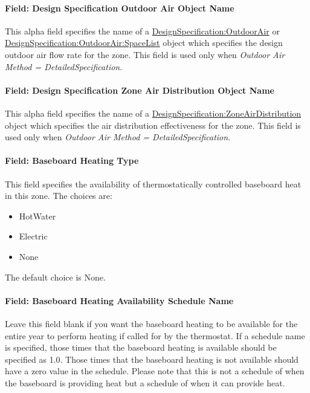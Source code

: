 \paragraph{Field: Design Specification Outdoor Air Object Name}\label{field-design-specification-outdoor-air-object-name-3-000}

This alpha field specifies the name of a \hyperref[designspecificationoutdoorair]{DesignSpecification:OutdoorAir} or \hyperref[designspecificationoutdoorairspacelist]{DesignSpecification:OutdoorAir:SpaceList} object which specifies the design outdoor air flow rate for the zone. This field is used only when \emph{Outdoor Air Method = DetailedSpecification}.

\paragraph{Field: Design Specification Zone Air Distribution Object Name}\label{field-design-specification-zone-air-distribution-object-name-2}

This alpha field specifies the name of a \hyperref[designspecificationzoneairdistribution]{DesignSpecification:ZoneAirDistribution} object which specifies the air distribution effectiveness for the zone. This field is used only when \emph{Outdoor Air Method = DetailedSpecification}.

\paragraph{Field: Baseboard Heating Type}\label{field-baseboard-heating-type-2}

This field specifies the availability of thermostatically controlled baseboard heat in this zone. The choices are:

\begin{itemize}
\item
  HotWater
\item
  Electric
\item
  None
\end{itemize}

The default choice is None.

\paragraph{Field: Baseboard Heating Availability Schedule Name}\label{field-baseboard-heating-availability-schedule-name-2}

Leave this field blank if you want the baseboard heating to be available for the entire year to perform heating if called for by the thermostat. If a schedule name is specified, those times that the baseboard heating is available should be specified as 1.0. Those times that the baseboard heating is not available should have a zero value in the schedule. Please note that this is not a schedule of when the baseboard is providing heat but a schedule of when it can provide heat.

